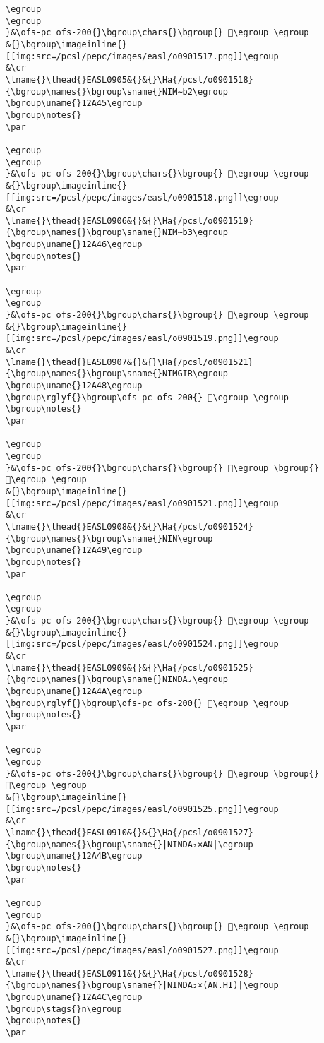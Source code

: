 \begin{verbatim}
\egroup
\egroup
}&\ofs-pc ofs-200{}\bgroup\chars{}\bgroup{} 𒩄\egroup \egroup
&{}\bgroup\imageinline{}[[img:src=/pcsl/pepc/images/easl/o0901517.png]]\egroup
&\cr
\lname{}\thead{}EASL0905&{}&{}\Ha{/pcsl/o0901518}{\bgroup\names{}\bgroup\sname{}NIM∼b2\egroup
\bgroup\uname{}12A45\egroup
\bgroup\notes{}
\par 

\egroup
\egroup
}&\ofs-pc ofs-200{}\bgroup\chars{}\bgroup{} 𒩅\egroup \egroup
&{}\bgroup\imageinline{}[[img:src=/pcsl/pepc/images/easl/o0901518.png]]\egroup
&\cr
\lname{}\thead{}EASL0906&{}&{}\Ha{/pcsl/o0901519}{\bgroup\names{}\bgroup\sname{}NIM∼b3\egroup
\bgroup\uname{}12A46\egroup
\bgroup\notes{}
\par 

\egroup
\egroup
}&\ofs-pc ofs-200{}\bgroup\chars{}\bgroup{} 𒩆\egroup \egroup
&{}\bgroup\imageinline{}[[img:src=/pcsl/pepc/images/easl/o0901519.png]]\egroup
&\cr
\lname{}\thead{}EASL0907&{}&{}\Ha{/pcsl/o0901521}{\bgroup\names{}\bgroup\sname{}NIMGIR\egroup
\bgroup\uname{}12A48\egroup
\bgroup\rglyf{}\bgroup\ofs-pc ofs-200{} 𒩈\egroup \egroup
\bgroup\notes{}
\par 

\egroup
\egroup
}&\ofs-pc ofs-200{}\bgroup\chars{}\bgroup{} 𒩇\egroup \bgroup{} 𒩈\egroup \egroup
&{}\bgroup\imageinline{}[[img:src=/pcsl/pepc/images/easl/o0901521.png]]\egroup
&\cr
\lname{}\thead{}EASL0908&{}&{}\Ha{/pcsl/o0901524}{\bgroup\names{}\bgroup\sname{}NIN\egroup
\bgroup\uname{}12A49\egroup
\bgroup\notes{}
\par 

\egroup
\egroup
}&\ofs-pc ofs-200{}\bgroup\chars{}\bgroup{} 𒩉\egroup \egroup
&{}\bgroup\imageinline{}[[img:src=/pcsl/pepc/images/easl/o0901524.png]]\egroup
&\cr
\lname{}\thead{}EASL0909&{}&{}\Ha{/pcsl/o0901525}{\bgroup\names{}\bgroup\sname{}NINDA₂\egroup
\bgroup\uname{}12A4A\egroup
\bgroup\rglyf{}\bgroup\ofs-pc ofs-200{} 𒩊\egroup \egroup
\bgroup\notes{}
\par 

\egroup
\egroup
}&\ofs-pc ofs-200{}\bgroup\chars{}\bgroup{} 𒩧\egroup \bgroup{} 𒩊\egroup \egroup
&{}\bgroup\imageinline{}[[img:src=/pcsl/pepc/images/easl/o0901525.png]]\egroup
&\cr
\lname{}\thead{}EASL0910&{}&{}\Ha{/pcsl/o0901527}{\bgroup\names{}\bgroup\sname{}|NINDA₂×AN|\egroup
\bgroup\uname{}12A4B\egroup
\bgroup\notes{}
\par 

\egroup
\egroup
}&\ofs-pc ofs-200{}\bgroup\chars{}\bgroup{} 𒩋\egroup \egroup
&{}\bgroup\imageinline{}[[img:src=/pcsl/pepc/images/easl/o0901527.png]]\egroup
&\cr
\lname{}\thead{}EASL0911&{}&{}\Ha{/pcsl/o0901528}{\bgroup\names{}\bgroup\sname{}|NINDA₂×(AN.HI)|\egroup
\bgroup\uname{}12A4C\egroup
\bgroup\stags{}n\egroup
\bgroup\notes{}
\par 


\end{verbatim}
